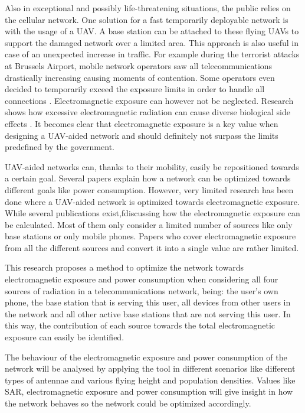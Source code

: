 \documentclass[twocolumn]{phdsymp} %
\begin{document}
Also in exceptional and possibly life-threatening situations, the public relies on the cellular network. 
One solution for a fast temporarily deployable network is with the usage of a \gls{UAV}. A base station can be attached to 
these flying \gls{UAV}s to support the damaged network over a limited area. 
This approach is also useful in case of an unexpected increase in traffic. 
For example during the terrorist attacks at Brussels Airport,
mobile network operators saw all telecommunications drastically increasing causing moments of contention. 
Some operators even decided to temporarily exceed the exposure limits in
order to handle all connections \cite{baseZaventem}.
Electromagnetic exposure can however not be neglected. 
Research shows how excessive electromagnetic radiation can cause diverse biological side effects \cite{bioeffects, WHO}.
It becomes clear that electromagnetic exposure is a key value  when designing a \gls{UAV}-aided network and should definitely 
not surpass the limits predefined by the government.

\gls{UAV}-aided networks can, thanks to their mobility, easily be repositioned towards a certain goal. Several papers 
explain how a network can be optimized towards different goals like power consumption.
However, very limited
research has been done where a \gls{UAV}-aided network is optimized towards  electromagnetic exposure.
While several publications exist,fdiscussing how the electromagnetic exposure can be calculated. 
Most of them only consider a limited number of sources like only base stations or only mobile phones.
Papers who cover electromagnetic exposure from all the different sources and convert it into a single value are rather limited.

This research proposes a method to optimize the network towards electromagnetic exposure and power consumption
when considering all four sources of radiation in a telecommunications network, being: the user's own phone,
 the base station that is serving this user, 
all devices from other users in the network and all 
other active base stations that are not serving this user. In this way, the contribution of each source towards the total 
electromagnetic exposure can easily be identified. 

The behaviour of the electromagnetic exposure and power consumption of the network will be analysed
 by applying the tool in different scenarios like different types of antennae and various flying height and population 
densities.
Values like \gls{SAR}, electromagnetic exposure and power consumption will 
 give insight in how the network  behaves so the network could be optimized accordingly.
\end{document}
